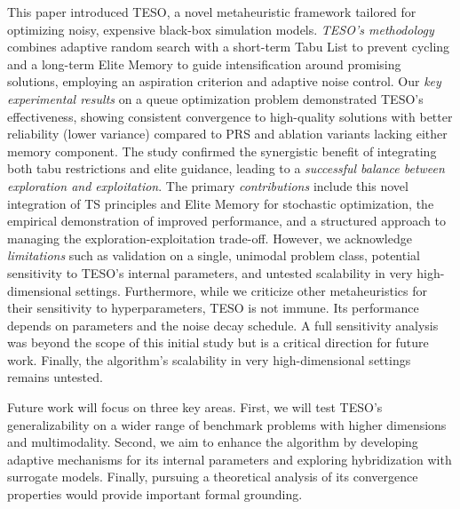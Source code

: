\documentclass{article}
\begin{document}
This paper introduced TESO, a novel metaheuristic framework tailored for optimizing noisy, expensive black-box simulation models. \textit{TESO's methodology} combines adaptive random search with a short-term Tabu List to prevent cycling and a long-term Elite Memory to guide intensification around promising solutions, employing an aspiration criterion and adaptive noise control. Our \textit{key experimental results} on a queue optimization problem demonstrated TESO's effectiveness, showing consistent convergence to high-quality solutions with better reliability (lower variance) compared to PRS and ablation variants lacking either memory component. The study confirmed the synergistic benefit of integrating both tabu restrictions and elite guidance, leading to a \textit{successful balance between exploration and exploitation}. The primary \textit{contributions} include this novel integration of TS principles and Elite Memory for stochastic optimization, the empirical demonstration of improved performance, and a structured approach to managing the exploration-exploitation trade-off. However, we acknowledge \textit{limitations} such as validation on a single, unimodal problem class, potential sensitivity to TESO's internal parameters, and untested scalability in very high-dimensional settings. Furthermore, while we criticize other metaheuristics for their sensitivity to hyperparameters, TESO is not immune. Its performance depends on parameters and the noise decay schedule. A full sensitivity analysis was beyond the scope of this initial study but is a critical direction for future work. Finally, the algorithm's scalability in very high-dimensional settings remains untested.

Future work will focus on three key areas. First, we will test TESO's generalizability on a wider range of benchmark problems with higher dimensions and multimodality. Second, we aim to enhance the algorithm by developing adaptive mechanisms for its internal parameters and exploring hybridization with surrogate models. Finally, pursuing a theoretical analysis of its convergence properties would provide important formal grounding.

  
  
\end{document}
